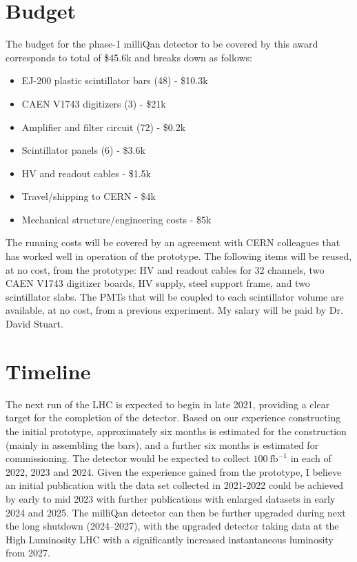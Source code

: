 \documentclass[11pt]{article}
\theoremstyle{plain} \numberwithin{equation}{section}
\theoremstyle{definition}
\begin{document}
\section*{Budget}

The budget for the phase-1 milliQan detector to be covered by this award corresponds to total of \$45.6k and
breaks down as follows:

\begin{itemize}
    \item EJ-200 plastic scintillator bars (48) - \$10.3k
    \item CAEN V1743 digitizers (3) - \$21k
    \item Amplifier and filter circuit (72)  - \$0.2k
    \item Scintillator panels (6) - \$3.6k
    \item HV and readout cables - \$1.5k
    \item Travel/shipping to CERN - \$4k
    \item Mechanical structure/engineering costs - \$5k
\end{itemize}

The running costs will be covered by an agreement with CERN colleagues that has 
worked well in operation of the prototype. The following items will be reused, at no 
cost, from the prototype: HV and readout cables for 32 channels, two CAEN V1743 digitizer boards,
HV supply, steel support frame, and two scintillator slabs. The PMTs that will be coupled to each scintillator volume
are available, at no cost, from a previous experiment. My salary will be paid by
Dr. David Stuart.

\section*{Timeline}

The next run of the LHC is expected to begin in late 2021, providing a clear target 
for the completion of the detector. Based on our experience constructing the initial prototype, 
approximately six months is estimated for the construction (mainly in assembling the bars),
and a further six months is estimated for commissioning. The detector would be expected to 
collect $100~\text{fb}^{-1}$ in each of 2022, 2023 and 2024.
Given the experience gained from the prototype, I believe an initial publication with the data set collected 
in 2021-2022 could be achieved by early to mid 2023 with further publications with enlarged datasets 
in early 2024 and 2025. The milliQan detector can then be further 
upgraded during next the long shutdown (2024--2027), with the upgraded
detector taking data at the High Luminosity LHC with a significantly increased instantaneous luminosity from 2027. 



% 
\end{document}
